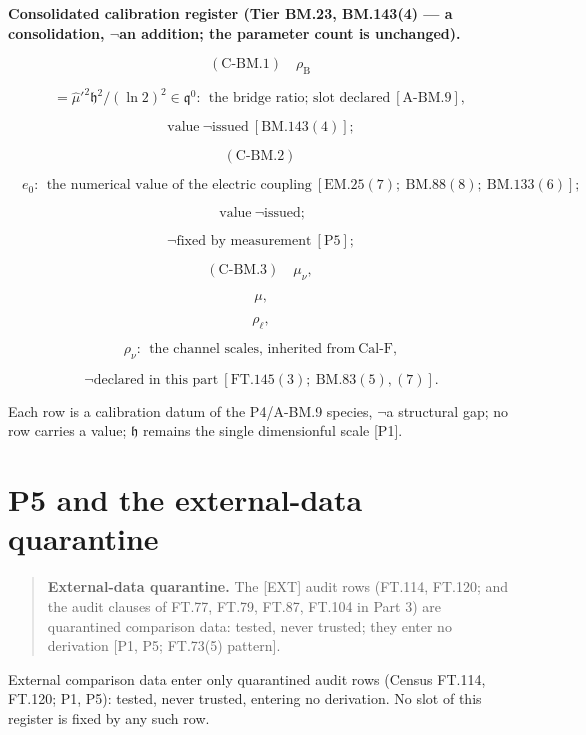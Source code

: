 \documentclass[11pt,openany]{report}
\theoremstyle{canonplain}
\theoremstyle{canondef}
\begin{document}
\textbf{Consolidated calibration register (Tier BM.23, BM.143(4) — a consolidation, $\neg$an addition; the parameter count is unchanged).}

\[
(\mathrm{C\text{-}BM.1})\quad\rho_{\mathrm B}
\]

\[
= \hat\mu'^2\mathfrak h^2/(\ln2)^2\in\mathfrak q^0:\ \ \text{the bridge ratio; slot declared}\ [\mathrm{A\text{-}BM.9}],
\]

\[
\ \text{value}\ \neg\text{issued}\ [\mathrm{BM.143}(4)];
\]

\[
(\mathrm{C\text{-}BM.2})
\]

\[
\quad e_0:\ \ \text{the numerical value of the electric coupling}\ [\mathrm{EM.25}(7);\ \mathrm{BM.88}(8);\ \mathrm{BM.133}(6)];
\]

\[
\ \ \text{value}\ \neg\text{issued};
\]

\[
\ \neg\text{fixed by measurement}\ [\mathrm{P5}];
\]

\[
(\mathrm{C\text{-}BM.3})\quad\mu_\nu,
\]

\[
\ \mu,
\]

\[
\ \rho_\ell,
\]

\[
\ \rho_\nu:\ \ \text{the channel scales, inherited from}\ \mathrm{Cal\text{-}F},
\]

\[
\ \neg\text{declared in this part}\ [\mathrm{FT.145}(3);\ \mathrm{BM.83}(5),(7)].
\]

Each row is a calibration datum of the P4/A-BM.9 species, $\neg$a structural gap; no row carries a value; $\mathfrak h$ remains the single dimensionful scale [P1].

\section*{\texorpdfstring{P5 and the external-data quarantine}{P5 and the external-data quarantine}}
\begin{quote}
\textbf{External-data quarantine.} The [EXT] audit rows (FT.114, FT.120; and the audit clauses of FT.77, FT.79, FT.87, FT.104 in Part 3) are quarantined comparison data: tested, never trusted; they enter no derivation [P1, P5; FT.73(5) pattern].

\end{quote}
External comparison data enter only quarantined audit rows (Census FT.114, FT.120; P1, P5): tested, never trusted, entering no derivation. No slot of this register is fixed by any such row.
\end{document}
